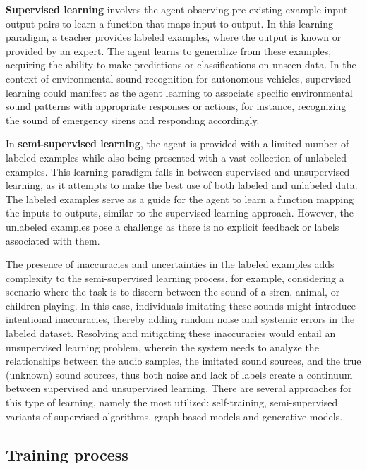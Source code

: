 \textbf{Supervised learning} involves the agent observing pre-existing example input-output pairs to learn a function that maps input to output. In this learning paradigm, a teacher provides labeled examples, where the output is known or provided by an expert. The agent learns to generalize from these examples, acquiring the ability to make predictions or classifications on unseen data. In the context of environmental sound recognition for autonomous vehicles, supervised learning could manifest as the agent learning to associate specific environmental sound patterns with appropriate responses or actions, for instance, recognizing the sound of emergency sirens and responding accordingly.

In \textbf{semi-supervised learning}, the agent is provided with a limited number of labeled examples while also being presented with a vast collection of unlabeled examples. This learning paradigm falls in between supervised and unsupervised learning, as it attempts to make the best use of both labeled and unlabeled data. The labeled examples serve as a guide for the agent to learn a function mapping the inputs to outputs, similar to the supervised learning approach. However, the unlabeled examples pose a challenge as there is no explicit feedback or labels associated with them.

The presence of inaccuracies and uncertainties in the labeled examples adds complexity to the semi-supervised learning process, for example, considering a scenario where the task is to discern between the sound of a siren, animal, or children playing. In this case, individuals imitating these sounds might introduce intentional inaccuracies, thereby adding random noise and systemic errors in the labeled dataset. Resolving and mitigating these inaccuracies would entail an unsupervised learning problem, wherein the system needs to analyze the relationships between the audio samples, the imitated sound sources, and the true (unknown) sound sources, thus both noise and lack of labels create a continuum between supervised and unsupervised learning. There are several approaches for this type of learning, namely the most utilized: self-training, semi-supervised variants of supervised algorithms, graph-based models and generative models.


\subsection{Training process}
\label{subsec:machine_learning_training}

